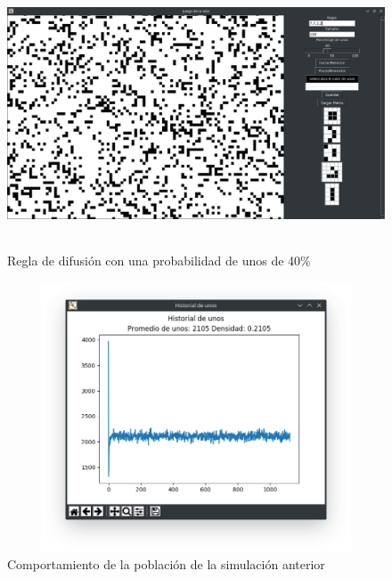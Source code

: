 \begin{figure}[H]
\begin{center}
 \includegraphics[width=12cm, height=8cm]{./img/diffusion40.png}
 \caption{Regla de difusión con una probabilidad de unos de 40\%}
 \label{fig:diffusion40}
\end{center}
\end{figure}

\begin{figure}[H]
\begin{center}
 \includegraphics[width=12cm, height=8cm]{./img/diffusion40grafica.png}
 \caption{Comportamiento de la población de la simulación anterior}
 \label{fig:diffusion40grafica}
\end{center}
\end{figure}

